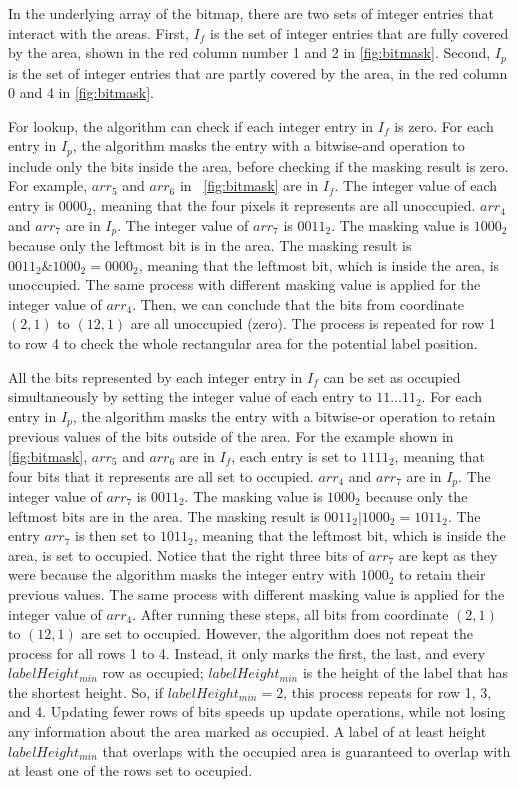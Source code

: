 In the underlying array of the bitmap, there are two sets of integer entries that interact with the areas.
First, $I_f$ is the set of integer entries that are fully covered by the area, shown in the red column number 1 and 2 in \autoref{fig:bitmask}.
Second, $I_p$ is the set of integer entries that are partly covered by the area, in the red column 0 and 4 in \autoref{fig:bitmask}.

For lookup, the algorithm can check if each integer entry in $I_f$ is zero.
For each entry in $I_p$, the algorithm masks the entry with a bitwise-and operation to include only the bits inside the area, before checking if the masking result is zero.
For example, $arr_5$ and $arr_6$ in \ \autoref{fig:bitmask} are in $I_f$. The integer value of each entry is $0000_2$, meaning that the four pixels it represents are all unoccupied.
$arr_4$ and $arr_7$ are in $I_p$.
The integer value of $arr_7$ is $0011_2$.
The masking value is $1000_2$ because only the leftmost bit is in the area.
The masking result is $0011_2 \& 1000_2 = 0000_2$, meaning that the leftmost bit, which is inside the area, is unoccupied.
The same process with different masking value is applied for the integer value of $arr_4$.
Then, we can conclude that the bits from coordinate $(2, 1)$ to $(12, 1)$ are all unoccupied (zero).
The process is repeated for row 1 to row 4 to check the whole rectangular area for the potential label position.

All the bits represented by each integer entry in $I_f$ can be set as occupied simultaneously by setting the integer value of each entry to $11...11_2$.
For each entry in $I_p$, the algorithm masks the entry with a bitwise-or operation to retain previous values of the bits outside of the area.
For the example shown in \autoref{fig:bitmask}, $arr_5$ and $arr_6$ are in $I_f$, each entry is set to $1111_2$, meaning that four bits that it represents are all set to occupied.
$arr_4$ and $arr_7$ are in $I_p$.
The integer value of $arr_7$ is $0011_2$.
The masking value is $1000_2$ because only the leftmost bits are in the area.
The masking result is $0011_2 | 1000_2 = 1011_2$.
The entry $arr_7$ is then set to $1011_2$, meaning that the leftmost bit, which is inside the area, is set to occupied.
Notice that the right three bits of $arr_7$ are kept as they were because the algorithm masks the integer entry with $1000_2$ to retain their previous values.
The same process with different masking value is applied for the integer value of $arr_4$.
After running these steps, all bits from coordinate $(2, 1)$ to $(12, 1)$ are set to occupied.
However, the algorithm does not repeat the process for all rows 1 to 4.
Instead, it only marks the first, the last, and every $labelHeight_{min}$ row as occupied; $labelHeight_{min}$ is the height of the label that has the shortest height.
So, if $labelHeight_{min}=2$, this process repeats for row 1, 3, and 4.
Updating fewer rows of bits speeds up update operations, while not losing any information about the area marked as occupied.
A label of at least height $labelHeight_{min}$ that overlaps with the occupied area is guaranteed to overlap with at least one of the rows set to occupied.

